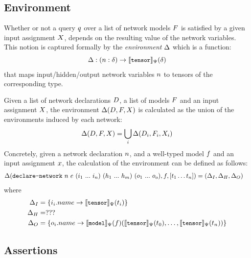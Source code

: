\subsection{Environment}
\label{sec:semantic-context}

Whether or not a query $q$ over a list of network models $F$ is satisfied by a given input assignment $X$, depends on the resulting value of the network variables. 
This notion is captured formally by the \emph{environment} $\Delta$ which is a function:
\begin{equation*}
\Delta : (n : \delta) \rightarrow \llbracket \texttt{\small tensor} \rrbracket_\Psi(\delta)
\end{equation*}
that maps input/hidden/output network variables $n$ to tensors of the corresponding type.

Given a list of network declarations $D$, a list of models $F$ and an input assignment $X$, the environment $\Delta (D, F, X)$ is calculated as the union of the environments induced by each network:
\begin{equation*}
\Delta (D, F, X) = \bigcup_i \Delta (D_i, F_i, X_i)
\end{equation*}
Concretely, given a network declaration $n$, and a well-typed model $f$ and an input assignment $x$, the calculation of the environment can be defined as follows:
\begin{align*}
\Delta (\texttt{declare-network} ~ n ~ e ~ (i_1~...~i_n) ~ (h_1~...~h_m) ~ (o_1~...~o_o), f, [t_1 \ldots t_n]) 
& = (\Delta_{I}, \Delta_{H}, \Delta_{O}) 
\end{align*}
where
\begin{align*}
\Delta_{I} 
&= \{ i_i.name \rightarrow \llbracket \texttt{\small tensor} \rrbracket_\Psi(t_i) \}
\\
\Delta_{H} 
&= ???
\\  
\Delta_{O} 
&= \{ o_i.name \rightarrow \llbracket \texttt{\small model} \rrbracket_{\Psi}(f)(\llbracket \texttt{\small tensor} \rrbracket_\Psi(t_0), \ldots, \llbracket \texttt{\small tensor} \rrbracket_\Psi(t_n)) \}
\end{align*}

\subsection{Assertions}

